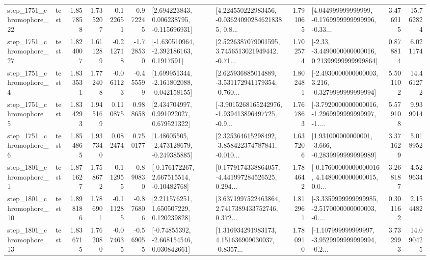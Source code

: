\begin{tabular}{llrrrrllrlrr}
 step\_1751\_chromophore\_22 &      test &      1.857858 &    1.735207 &     -0.122651 & -0.972245 &    [2.694223843, 0.006238795, -0.115696931] &  [4.224550222983456, -0.036240902846218385, 0.8... &       1.791065 &  [4.044999999999999, -0.1769999999999996, -0.33... &            3.476915 &         15.762824 \\
 step\_1751\_chromophore\_27 &      test &      1.824007 &    1.611289 &     -0.212718 & -1.728530 &     [-1.630510964, -2.392186163, 0.1917591] &  [2.5226387079001595, 3.7456513021949442, -0.71... &       1.702574 &  [-2.33, -3.4490000000000016, 0.21399999999999864] &            0.878814 &          6.021174 \\
  step\_1751\_chromophore\_4 &      test &      1.833531 &    1.772408 &     -0.061123 & -0.455599 &   [1.699951344, -2.161802088, -0.042158155] &  [2.625936885014889, -3.531172941179354, -0.760... &       1.802481 &  [-2.4930000000000003, 3.216, -0.3279999999999994] &            5.501102 &         14.461272 \\
  step\_1751\_chromophore\_5 &      test &      1.834293 &    1.945169 &      0.110875 &  0.988658 &     [2.434704997, 0.991022027, 0.679521322] &  [-3.9015268165242976, -1.939413896497725, -0.9... &       1.767863 &  [-3.7920000000000016, -1.2969999999999997, -1.... &            5.579108 &          9.939914 \\
  step\_1751\_chromophore\_6 &      test &      1.854865 &    1.937340 &      0.082474 &  0.750177 &    [1.48605505, -2.473128679, -0.249385885] &  [2.325364615298492, -3.858422374787841, -0.010... &       1.637206 &   [1.931000000000001, -3.666, -0.2839999999999989] &            3.371629 &          5.018952 \\
  step\_1801\_chromophore\_1 &      test &      1.871627 &    1.758672 &     -0.112955 & -0.890830 &    [-0.176172267, 2.667515514, -0.10482768] &  [0.1779174338864057, -4.441997284526525, 0.294... &       1.784642 &  [-0.17600000000000016, 4.1480000000000015, 0.0... &            3.268187 &          4.529634 \\
 step\_1801\_chromophore\_10 &      test &      1.898186 &    1.786901 &     -0.111285 & -0.876806 &     [2.211576251, 1.650507229, 0.120239828] &  [3.6371997522463864, 2.7417389433752746, 0.372... &       1.812961 &  [-3.3359999999999985, -2.5170000000000003, -0.... &            0.301162 &          2.154482 \\
 step\_1801\_chromophore\_13 &      test &      1.836715 &    1.762080 &     -0.074635 & -0.569055 &    [-0.74855392, -2.668154546, 0.030842661] &  [1.316934291983173, 4.151636909030037, -0.8357... &       1.780910 &  [-1.107999999999997, -3.9529999999999994, -0.2... &            3.732993 &         14.090425 \\

\end{tabular}
